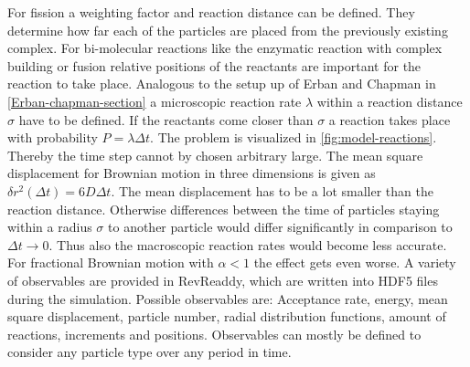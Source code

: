 \documentclass[
  a4paper,BCOR10mm,oneside,
  headsepline,footsepline,%
  fleqn,openbib
]{scrbook}
\begin{document}
\par
For fission a weighting factor and reaction distance can be defined. They determine how far each of the particles are placed from the previously existing complex. For bi-molecular reactions like the enzymatic reaction with complex building  or fusion  relative positions of the reactants are important for the reaction to take place. Analogous to the setup up of Erban and Chapman in \cref{Erban-chapman-section} a microscopic reaction rate $\lambda$ within a reaction distance $\sigma$ have to be defined. If the reactants come closer than $\sigma$ a reaction takes place with probability $P= \lambda \Delta t$. The problem is visualized in \cref{fig:model-reactions}. Thereby the time step cannot by chosen arbitrary large. The mean square displacement for Brownian motion in three dimensions is given as $\delta r^2(\Delta t)= 6D \Delta t$. The mean displacement has to be a lot smaller than the reaction distance. Otherwise differences between the time of particles staying within a radius $\sigma$ to another particle would differ significantly in comparison to $\Delta t \rightarrow 0$. Thus also the macroscopic reaction rates would become less accurate. For fractional Brownian motion with $\alpha<1$ the effect gets even worse. A variety of observables are provided in RevReaddy, which are written into HDF5 files during the simulation. Possible observables are: Acceptance rate, energy, mean square displacement, particle number, radial distribution functions, amount of reactions, increments and positions. Observables can mostly be defined to consider any particle type over any period in time. 
\end{document}

